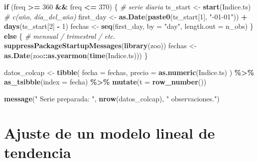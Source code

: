 \documentclass[
  11pt,
]{book}
\newenvironment{Shaded}{\begin{snugshade}}{\end{snugshade}}
\newcommand{\AttributeTok}[1]{\textcolor[rgb]{0.13,0.29,0.53}{#1}}
\newcommand{\CommentTok}[1]{\textcolor[rgb]{0.56,0.35,0.01}{\textit{#1}}}
\newcommand{\ControlFlowTok}[1]{\textcolor[rgb]{0.13,0.29,0.53}{\textbf{#1}}}
\newcommand{\DecValTok}[1]{\textcolor[rgb]{0.00,0.00,0.81}{#1}}
\newcommand{\FunctionTok}[1]{\textcolor[rgb]{0.13,0.29,0.53}{\textbf{#1}}}
\newcommand{\NormalTok}[1]{#1}
\newcommand{\OtherTok}[1]{\textcolor[rgb]{0.56,0.35,0.01}{#1}}
\newcommand{\SpecialCharTok}[1]{\textcolor[rgb]{0.81,0.36,0.00}{\textbf{#1}}}
\newcommand{\StringTok}[1]{\textcolor[rgb]{0.31,0.60,0.02}{#1}}
\begin{document}
\begin{Shaded}
\begin{Highlighting}[]
\ControlFlowTok{if}\NormalTok{ (freq }\SpecialCharTok{\textgreater{}=} \DecValTok{360} \SpecialCharTok{\&\&}\NormalTok{ freq }\SpecialCharTok{\textless{}=} \DecValTok{370}\NormalTok{) \{        }\CommentTok{\# serie diaria}
\NormalTok{  ts\_start  }\OtherTok{\textless{}{-}} \FunctionTok{start}\NormalTok{(Indice.ts)          }\CommentTok{\# c(año, día\_del\_año)}
\NormalTok{  first\_day }\OtherTok{\textless{}{-}} \FunctionTok{as.Date}\NormalTok{(}\FunctionTok{paste0}\NormalTok{(ts\_start[}\DecValTok{1}\NormalTok{], }\StringTok{"{-}01{-}01"}\NormalTok{)) }\SpecialCharTok{+}
               \FunctionTok{days}\NormalTok{(ts\_start[}\DecValTok{2}\NormalTok{] }\SpecialCharTok{{-}} \DecValTok{1}\NormalTok{)}
\NormalTok{  fechas }\OtherTok{\textless{}{-}} \FunctionTok{seq}\NormalTok{(first\_day, }\AttributeTok{by =} \StringTok{"day"}\NormalTok{, }\AttributeTok{length.out =}\NormalTok{ n\_obs)}
\NormalTok{\} }\ControlFlowTok{else}\NormalTok{ \{                                 }\CommentTok{\# mensual / trimestral / etc.}
  \FunctionTok{suppressPackageStartupMessages}\NormalTok{(}\FunctionTok{library}\NormalTok{(zoo))}
\NormalTok{  fechas }\OtherTok{\textless{}{-}} \FunctionTok{as.Date}\NormalTok{(zoo}\SpecialCharTok{::}\FunctionTok{as.yearmon}\NormalTok{(}\FunctionTok{time}\NormalTok{(Indice.ts)))}
\NormalTok{\}}

\NormalTok{datos\_colcap }\OtherTok{\textless{}{-}} \FunctionTok{tibble}\NormalTok{(}
  \AttributeTok{fecha  =}\NormalTok{ fechas,}
  \AttributeTok{precio =} \FunctionTok{as.numeric}\NormalTok{(Indice.ts)}
\NormalTok{) }\SpecialCharTok{\%\textgreater{}\%}
  \FunctionTok{as\_tsibble}\NormalTok{(}\AttributeTok{index =}\NormalTok{ fecha) }\SpecialCharTok{\%\textgreater{}\%}
  \FunctionTok{mutate}\NormalTok{(}\AttributeTok{t =} \FunctionTok{row\_number}\NormalTok{())}

\FunctionTok{message}\NormalTok{(}\StringTok{" Serie preparada: "}\NormalTok{, }\FunctionTok{nrow}\NormalTok{(datos\_colcap), }\StringTok{" observaciones."}\NormalTok{)}
\end{Highlighting}
\end{Shaded}

\section{Ajuste de un modelo lineal de tendencia}\label{ajuste-de-un-modelo-lineal-de-tendencia}
\end{document}
